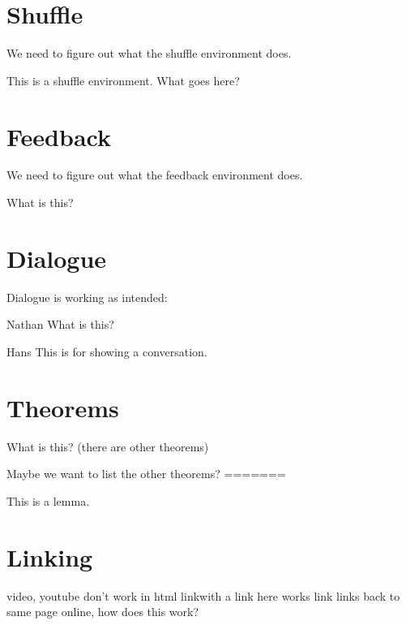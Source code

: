 \documentclass{ximera}
\begin{document}
\section{Shuffle}

We need to figure out what the shuffle environment does.

\begin{shuffle}
This is a shuffle environment. What goes here?
\end{shuffle}


\section{Feedback}

We need to figure out what the feedback environment does.

\begin{feedback}
What is this?
\end{feedback}

\section{Dialogue}

Dialogue is working as intended:

\begin{dialogue}
\item[Nathan] What is this?
\item[Hans] This is for showing a conversation.
\end{dialogue}

\section{Theorems}

\begin{theorem}
What is this? (there are other theorems)
\end{theorem}

Maybe we want to list the other theorems?
=======
\begin{lemma}
This is a lemma.
\end{lemma}



\section{Linking}

video, youtube don't work in html
link{with a link here} works
link{} links back to same page online, how does this work?
\end{document}
